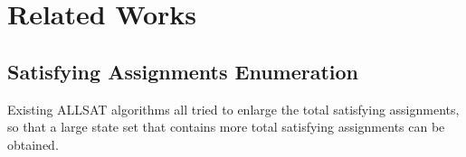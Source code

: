 \documentclass[journal]{IEEEtran}
\begin{document}
\section{Related Works}\label{sec_relwork}
%
%
%
%
%

\subsection{Satisfying Assignments Enumeration}

Existing ALLSAT algorithms all tried to enlarge the total satisfying assignments,
so that a large state set that contains more total satisfying assignments can be obtained.
\end{document}
